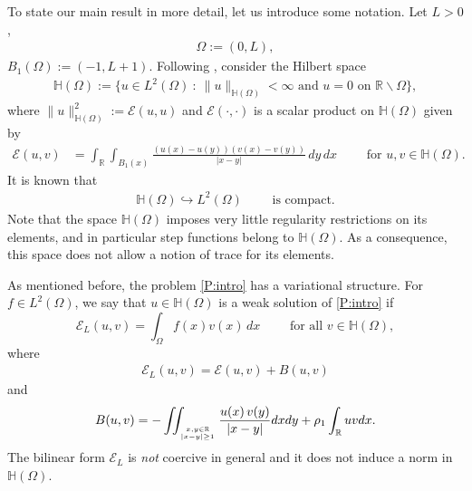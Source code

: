 \documentclass[10 pt]{article}
\numberwithin{equation}{section}
\def\R{\mathbb{R}}
\def\mH{\mathbb{H}}
\def\cE{\mathcal{E}}
\begin{document}
To state our main result in more detail, let us introduce some notation. Let $L>0$,
\begin{align*}
\Omega:=(0,L),
\end{align*}
 $B_1(\Omega):=(-1,L+1)$. Following \cite{CW19}, consider the Hilbert space
\begin{align*}
\mH(\Omega):=\{u\in L^2(\Omega)\::\: \|u\|_{\mathbb H(\Omega)}<\infty \text{ and }u=0\text{ on }\R\backslash \Omega\},
\end{align*}
where $\|u\|^2_{\mathbb H(\Omega)}:={\mathcal E}(u,u)$ and ${\mathcal E}(\cdot,\cdot)$ is a scalar product on $\mathbb H(\Omega)$ given by
\begin{align*}
    {\mathcal E}(u,v)&=\int_{\R}\int_{B_1(x)}\frac{(u(x)-u(y))(v(x)-v(y))}{|x-y|}\, dy\, dx \qquad \text{ for }u,v\in \mH(\Omega).
\end{align*}
It is known that
\begin{align}\label{c:em}
\mathbb H(\Omega)\hookrightarrow L^2(\Omega)\qquad \text{ is compact.}
\end{align}
Note that the space $\mH(\Omega)$ imposes very little regularity restrictions on its elements, and in particular step functions belong to $\mH(\Omega)$. As a consequence, this space does not allow a notion of trace for its elements.

As mentioned before, the problem \eqref{P:intro} has a variational structure. For $f\in L^2(\Omega)$, we say that $u\in \mH(\Omega)$ is a weak solution of \eqref{P:intro} if
\begin{equation*}
    \cE_{L}(u,v)=\int_{\Omega} f(x) v(x)\, dx \qquad \text{ for all } v\in  \mH(\Omega),
\end{equation*}
where 
\begin{align}\label{cEL:def}
\cE_L(u,v)=\cE(u,v)+B(u,v) 
\end{align}
and
\begin{align}\label{eq:bilinear_B}
    B(u,v)=-\iint_{x,y\in\R\atop |x-y|\geq 1}\frac{u(x)\,v(y)}{|x-y|}dx dy+\rho_1\int_{\R}u v dx.
\end{align}
 The bilinear form $\cE_L$ is \emph{not} coercive in general and it does not induce a norm in $\mH(\Omega)$.
\end{document}
